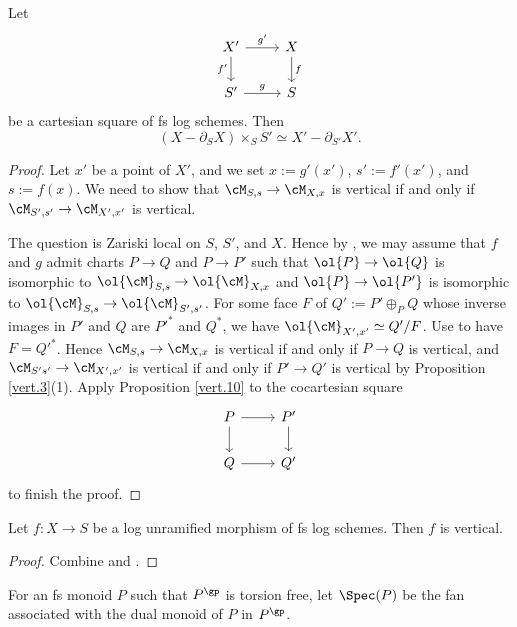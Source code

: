\documentclass[10pt]{amsart}
\begin{document}
\begin{prop}
\label{vert.5}
Let
\[
\begin{tikzcd}
X'\ar[d,"f'"']\ar[r,"g'"]&
X\ar[d,"f"]
\\
S'\ar[r,"g"]&
S
\end{tikzcd}
\]
be a cartesian square of fs log schemes.
Then
\[
(X-\partial_S X)\times_S S'
\simeq
X'-\partial_{S'}X'.
\]
\end{prop}
\begin{proof}
Let $x'$ be a point of $X'$, and we set $x:=g'(x')$, $s':=f'(x')$, and $s:=f(x)$.
We need to show that $\cM_{S,s}\to \cM_{X,x}$ is vertical if and only if $\cM_{S',s'}\to \cM_{X',x'}$ is vertical.

The question is Zariski local on $S$, $S'$, and $X$.
Hence by \cite[Remark II.2.3.2]{Ogu}, we may assume that $f$ and $g$ admit charts $P\to Q$ and $P\to P'$ such that $\ol{P}\to \ol{Q}$ is isomorphic to $\ol{\cM}_{S,s}\to \ol{\cM}_{X,x}$ and $\ol{P}\to \ol{P'}$ is isomorphic to $\ol{\cM}_{S,s}\to \ol{\cM}_{S',s'}$.
For some face $F$ of $Q':=P'\oplus_P Q$ whose inverse images in $P'$ and $Q$ are $P'^*$ and $Q^*$, we have $\ol{\cM}_{X',x'}\simeq Q'/F$.
Use \cite[Corollaries I.2.3.8, I.4.2.16]{Ogu} to have $F=Q'^*$.
Hence $\cM_{S,s}\to \cM_{X,x}$ is vertical if and only if $P\to Q$ is vertical, and $\cM_{S's'}\to \cM_{X',x'}$ is vertical if and only if $P'\to Q'$ is vertical by Proposition \ref{vert.3}(1).
Apply Proposition \ref{vert.10} to the cocartesian square
\[
\begin{tikzcd}
P\ar[d]\ar[r]&
P'\ar[d]
\\
Q\ar[r]&
Q'
\end{tikzcd}
\]
to finish the proof.
\end{proof}



\begin{prop}
\label{vert.8}
Let $f\colon X\to S$ be a log unramified morphism of fs log schemes.
Then $f$ is vertical.
\end{prop}
\begin{proof}
Combine \cite[Proposition IV.3.4.1]{Ogu} and \cite[Lemma 5.6(1)]{zbMATH05809283}.
\end{proof}


\begin{df}
For an fs monoid $P$ such that $P^\gp$ is torsion free, let $\Spec(P)$ be the fan associated with the dual monoid of $P$ in $P^\gp$.
\end{df}
\end{document}
